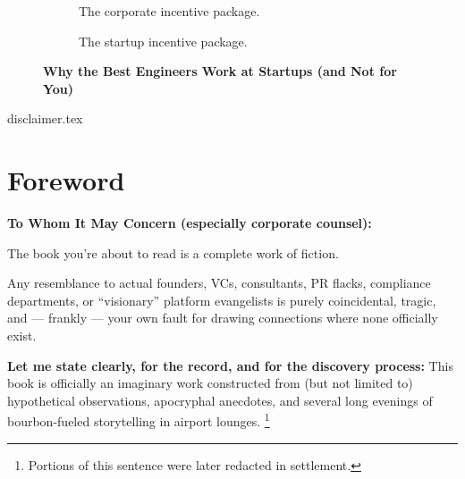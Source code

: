 \documentclass{article}
\begin{document}
\begin{titlepage}
\begin{figure}[H]
      \begin{subfigure}[t]{0.45\textwidth}
      \centering
      \caption*{The corporate incentive package.}
      \end{subfigure}
      \hfill
      \begin{subfigure}[t]{0.45\textwidth}
      \centering
      \caption*{The startup incentive package.}
      \end{subfigure}
      
      \caption*{\textbf{Why the Best Engineers Work at Startups (and Not for You)}}
    \end{figure}
      
  
  \end{titlepage}

  {disclaimer.tex}

  \section*{Foreword}
  
  \bigskip
  
  \textbf{To Whom It May Concern (especially corporate counsel):}
  
  The book you’re about to read is a complete work of fiction.
  
  Any resemblance to actual founders, VCs, consultants, PR flacks, compliance departments, or 
  ``visionary'' platform evangelists is purely coincidental, tragic, and --- frankly --- your own fault 
  for drawing connections where none officially exist.
  
  \textbf{Let me state clearly, for the record, and for the discovery process:}
  This book is officially an imaginary work 
  constructed from (but not limited to) hypothetical observations, apocryphal anecdotes, and several long evenings of 
  bourbon-fueled storytelling in airport lounges.
  \footnote{Portions of this sentence were later redacted in settlement.}
\end{document}
